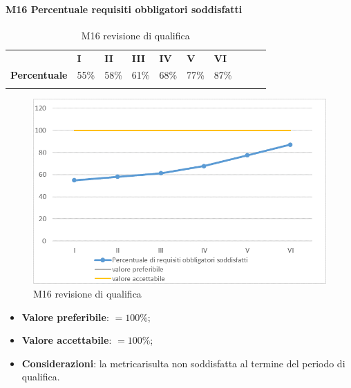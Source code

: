 \paragraph{M16 Percentuale requisiti obbligatori soddisfatti} \mbox{}
\begin{longtable}[H!] {						
		>{}p{50mm}  		
		>{}p{8mm}
		>{}p{8mm}		
		>{}p{8mm}		
		>{}p{8mm}		
		>{}p{8mm}		
		>{}p{8mm}
		>{}p{8mm}
		>{}p{8mm}
		>{}p{8mm}
	}
	\rowcolor{gray!50}
	\textbf{} & \textbf{I} & \textbf{II} & \textbf{III} & \textbf{IV} & \textbf{V} & \textbf{VI} \TBstrut \\ [2mm]
	\textbf{Percentuale} & 55\% & 58\% & 61\% & 68\% & 77\% & 87\% \TBstrut \\ [2mm]
	\rowcolor{white}
	\caption{M16 revisione di qualifica}
\end{longtable}
\begin{figure}[H] 	
	\includegraphics[width=\linewidth]{./img/grafici/RQ16.png}	
	\caption{M16 revisione di qualifica}	
\end{figure}
\begin{itemize}
	\item \textbf{Valore preferibile}: $=100\%$;
	\item \textbf{Valore accettabile}: $=100\%$;
	\item \textbf{Considerazioni}: la metrica\glosp risulta non soddisfatta al termine del periodo di qualifica.
\end{itemize}

